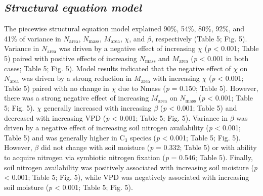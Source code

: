 \subsection{\textit{Structural equation model}}
The piecewise structural equation model explained 90\%, 54\%, 80\%, 92\%, and 41\% of variance in $N_\mathrm{area}$, $N_\mathrm{mass}$, $M_\mathrm{area}$, $\chi$, and $\beta$, respectively (Table 5; Fig. 5). Variance in $N_\mathrm{area}$ was driven by a negative effect of increasing $\chi$ (\textit{p} < 0.001; Table 5) paired with positive effects of increasing $N_\mathrm{mass}$ and $M_\mathrm{area}$ (\textit{p} < 0.001 in both cases; Table 5; Fig. 5). Model results indicated that the negative effect of $\chi$ on $N_\mathrm{area}$ was driven by a strong reduction in $M_\mathrm{area}$ with increasing $\chi$ (\textit{p} < 0.001; Table 5) paired with no change in $\chi$ due to Nmass (\textit{p} = 0.150; Table 5). However, there was a strong negative effect of increasing $M_\mathrm{area}$ on $N_\mathrm{mass}$ (\textit{p} < 0.001; Table 5; Fig. 5). $\chi$ generally increased with increasing $\beta$  (\textit{p} < 0.001; Table 5) and decreased with increasing VPD (\textit{p} < 0.001; Table 5; Fig. 5). Variance in $\beta$  was driven by a negative effect of increasing soil nitrogen availability (\textit{p} < 0.001; Table 5) and was generally higher in C$_3$ species (\textit{p} < 0.001; Table 5; Fig. 5). However, $\beta$ did not change with soil moisture (\textit{p} = 0.332; Table 5) or with ability to acquire nitrogen via symbiotic nitrogen fixation (\textit{p} = 0.546; Table 5). Finally, soil nitrogen availability was positively associated with increasing soil moisture (\textit{p} < 0.001; Table 5; Fig. 5), while VPD was negatively associated with increasing soil moisture (\textit{p} < 0.001; Table 5; Fig. 5).

